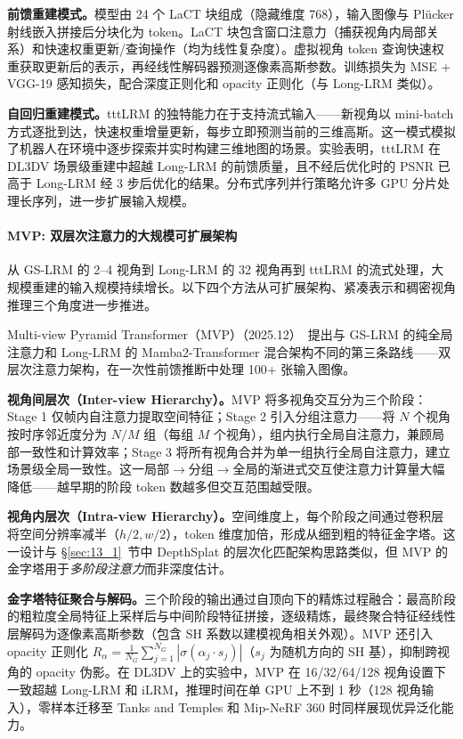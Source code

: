 \textbf{前馈重建模式。}模型由 24 个 LaCT 块组成（隐藏维度 768），输入图像与 Pl\"ucker 射线嵌入拼接后分块化为 token。LaCT 块包含窗口注意力（捕获视角内局部关系）和快速权重更新/查询操作（均为线性复杂度）。虚拟视角 token 查询快速权重获取更新后的表示，再经线性解码器预测逐像素高斯参数。训练损失为 MSE + VGG-19 感知损失，配合深度正则化和 opacity 正则化（与 Long-LRM 类似）。

\textbf{自回归重建模式。}tttLRM 的独特能力在于支持流式输入——新视角以 mini-batch 方式逐批到达，快速权重增量更新，每步立即预测当前的三维高斯。这一模式模拟了机器人在环境中逐步探索并实时构建三维地图的场景。实验表明，tttLRM 在 DL3DV 场景级重建中超越 Long-LRM 的前馈质量，且不经后优化时的 PSNR 已高于 Long-LRM 经 3 步后优化的结果。分布式序列并行策略允许多 GPU 分片处理长序列，进一步扩展输入规模。

\paragraph{MVP: 双层次注意力的大规模可扩展架构}

从 GS-LRM 的 2--4 视角到 Long-LRM 的 32 视角再到 tttLRM 的流式处理，大规模重建的输入规模持续增长。以下四个方法从可扩展架构、紧凑表示和稠密视角推理三个角度进一步推进。

Multi-view Pyramid Transformer（MVP）（2025.12）~\cite{2512_07806}提出与 GS-LRM 的纯全局注意力和 Long-LRM 的 Mamba2-Transformer 混合架构不同的第三条路线——双层次注意力架构，在一次性前馈推断中处理 100+ 张输入图像。

\textbf{视角间层次（Inter-view Hierarchy）。}MVP 将多视角交互分为三个阶段：Stage 1 仅帧内自注意力提取空间特征；Stage 2 引入分组注意力——将 $N$ 个视角按时序邻近度分为 $N/M$ 组（每组 $M$ 个视角），组内执行全局自注意力，兼顾局部一致性和计算效率；Stage 3 将所有视角合并为单一组执行全局自注意力，建立场景级全局一致性。这一局部$\to$分组$\to$全局的渐进式交互使注意力计算量大幅降低——越早期的阶段 token 数越多但交互范围越受限。

\textbf{视角内层次（Intra-view Hierarchy）。}空间维度上，每个阶段之间通过卷积层将空间分辨率减半（$h/2, w/2$），token 维度加倍，形成从细到粗的特征金字塔。这一设计与 §\ref{sec:13_1}~节中 DepthSplat 的层次化匹配架构思路类似，但 MVP 的金字塔用于\emph{多阶段注意力}而非深度估计。

\textbf{金字塔特征聚合与解码。}三个阶段的输出通过自顶向下的精炼过程融合：最高阶段的粗粒度全局特征上采样后与中间阶段特征拼接，逐级精炼，最终聚合特征经线性层解码为逐像素高斯参数（包含 SH 系数以建模视角相关外观）。MVP 还引入 opacity 正则化 $R_\alpha = \frac{1}{N_G}\sum_{j=1}^{N_G}|\sigma(\alpha_j \cdot s_j)|$（$s_j$ 为随机方向的 SH 基），抑制跨视角的 opacity 伪影。在 DL3DV 上的实验中，MVP 在 16/32/64/128 视角设置下一致超越 Long-LRM 和 iLRM，推理时间在单 GPU 上不到 1 秒（128 视角输入），零样本迁移至 Tanks and Temples 和 Mip-NeRF 360 时同样展现优异泛化能力。

